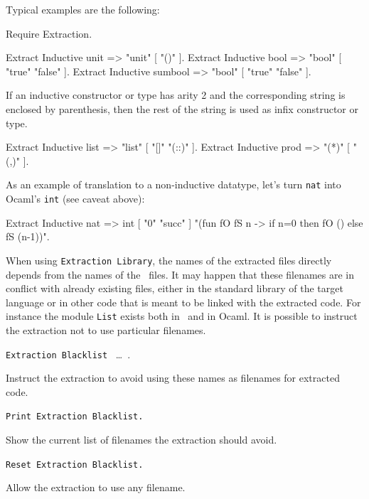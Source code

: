 \Example
Typical examples are the following:
\begin{coq_eval}
Require Extraction.
\end{coq_eval}
\begin{coq_example}
Extract Inductive unit => "unit" [ "()" ].
Extract Inductive bool => "bool" [ "true" "false" ].
Extract Inductive sumbool => "bool" [ "true" "false" ].
\end{coq_example}

\noindent If an inductive constructor or type has arity 2 and the corresponding 
string is enclosed by parenthesis, then the rest of the string is used
as infix constructor or type. 
\begin{coq_example}
Extract Inductive list => "list" [ "[]" "(::)" ].
Extract Inductive prod => "(*)"  [ "(,)" ].
\end{coq_example}

\noindent As an example of translation to a non-inductive datatype, let's turn
{\tt nat} into Ocaml's {\tt int} (see caveat above):
\begin{coq_example}
Extract Inductive nat => int [ "0" "succ" ]
 "(fun fO fS n -> if n=0 then fO () else fS (n-1))".
\end{coq_example}



When using {\tt Extraction Library}, the names of the extracted files
directly depends from the names of the \Coq\ files. It may happen that
these filenames are in conflict with already existing files, 
either in the standard library of the target language or in other
code that is meant to be linked with the extracted code. 
For instance the module {\tt List} exists both in \Coq\ and in Ocaml.
It is possible to instruct the extraction not to use particular filenames.

\begin{description}
\item{\tt Extraction Blacklist} \ident\ \dots\ \ident. ~\par
  Instruct the extraction to avoid using these names as filenames
  for extracted code. 
\item{\tt Print Extraction Blacklist.} ~\par
  Show the current list of filenames the extraction should avoid.
\item{\tt Reset Extraction Blacklist.} ~\par
  Allow the extraction to use any filename.
\end{description}

